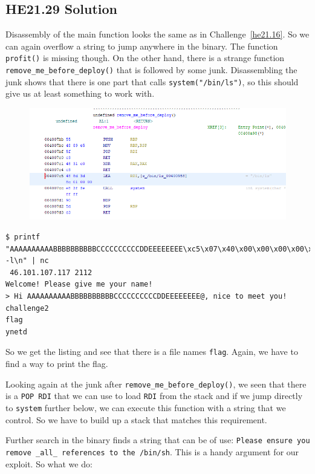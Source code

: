 \documentclass[english,a4paper,nols,noindent]{tufte-handout}
\begin{document}
\hypertarget{he21.29-solution}{%
\subsection{HE21.29 Solution}\label{he21.29-solution}}

\noindent Disassembly of the main function looks the same as in
Challenge~\ref{he21.16}.  So we can again overflow a string to jump anywhere in
the binary.  The function \verb+profit()+ is missing though.  On the other
hand, there is a strange function \verb+remove_me_before_deploy()+ that is
followed by some junk.  Disassembling the junk shows that there is one part
that calls \verb+system("/bin/ls")+, so this should give us at least something
to work with.

\begin{figure}
    \includegraphics[width=150mm]{ch29/remove_me_before_deploy.png}
\end{figure}

{\footnotesize\begin{verbatim}
$ printf "AAAAAAAAAABBBBBBBBBBCCCCCCCCCCDDEEEEEEEE\xc5\x07\x40\x00\x00\x00\x00\x00\nls -l\n" | nc
 46.101.107.117 2112
Welcome! Please give me your name!
> Hi AAAAAAAAAABBBBBBBBBBCCCCCCCCCCDDEEEEEEEE@, nice to meet you!
challenge2
flag
ynetd
\end{verbatim} 
}

So we get the listing and see that there is a file names \verb+flag+.  Again,
we have to find a way to print the flag.

Looking again at the junk after \verb+remove_me_before_deploy()+, we seen that
there is a \verb+POP RDI+ that we can use to load \verb+RDI+ from the stack and
if we jump directly to \verb+system+ further below, we can execute this
function with a string that we control.  So we have to build up a stack that
matches this requirement.

Further search in the binary finds a string that can be of use: 
\verb+Please ensure you remove _all_ references to the /bin/sh+.  This is a handy argument for our exploit.  So what we do:
\end{document}
